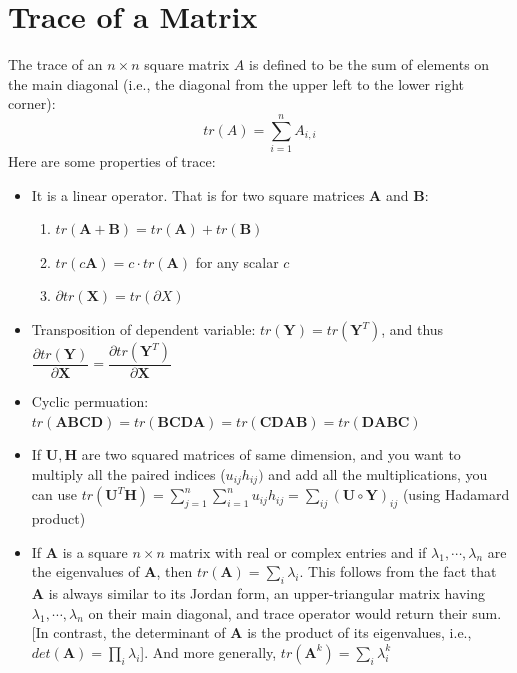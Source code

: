 \documentclass[conference,final,11pt,technote,onecolumn]{IEEEtran}\usepackage[]{graphicx}\usepackage[]{color}
\begin{document}
\section{Trace of a Matrix}
\label{term:trace_of_a_matrix}
The trace of an $n\times n$ square matrix $A$ is defined to be the sum of elements on the main diagonal (i.e., the diagonal from the upper left to the lower right corner):
\[
tr(A) = \sum_{i=1}^nA_{i,i}
\]
Here are some properties of trace:
\begin{itemize}
	\item It is a linear operator. That is for two square matrices $\mathbf{A}$ and $\mathbf{B}$: 
		\begin{enumerate}
			\item $tr(\mathbf{A}+\mathbf{B}) = tr(\mathbf{A}) + tr(\mathbf{B})$
			\item $tr(c\mathbf{A}) = c\cdot tr(\mathbf{A})$ for any scalar $c$
			\item $\partial tr(\mathbf{X}) = tr(\partial X)$
		\end{enumerate}
	\item Transposition of dependent variable: $tr(\mathbf{Y}) = tr(\mathbf{Y}^T)$, and thus $\dfrac{\partial tr(\mathbf{Y})}{\partial \mathbf{X}} = \dfrac{\partial tr(\mathbf{Y}^T)}{\partial \mathbf{X}}$
	\item Cyclic permuation: $tr(\mathbf{ABCD}) = tr(\mathbf{BCDA}) = tr(\mathbf{CDAB}) = tr(\mathbf{DABC})$
	\item If $\mathbf{U}, \mathbf{H}$ are two squared matrices of same dimension, and you want to multiply all the paired indices ($u_{ij}h_{ij})$ and add all the multiplications, you can use $tr({\mathbf{U}^T\mathbf{H}}) = \sum_{j=1}^n\sum_{i=1}^nu_{ij}h_{ij} = \sum_{ij}(\mathbf{U}\circ \mathbf{Y})_{ij}$ (using Hadamard product)
	\item If $\mathbf{A}$ is a square $n\times n$ matrix with real or complex entries and if $\lambda_1, \cdots, \lambda_n$ are the eigenvalues of $\mathbf{A}$, then $tr(\mathbf{A}) = \sum_i\lambda_i$. This follows from the fact that $\mathbf{A}$ is always similar to its Jordan form, an upper-triangular matrix having $\lambda_1, \cdots, \lambda_n$ on their main diagonal, and trace operator would return their sum. [In contrast, the determinant of $\mathbf{A}$ is the product of its eigenvalues, i.e., $det(\mathbf{A}) = \prod_i\lambda_i$]. And more generally, $tr(\mathbf{A}^k) = \sum_i\lambda^k_i$
\end{itemize}
\end{document}
